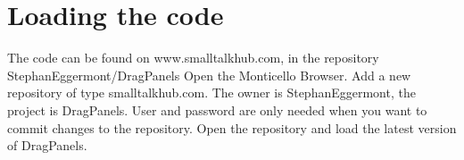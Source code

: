 \documentclass[10pt, twoside]{article}   	%
\begin{document}
\section{Loading the code}
The code can be found on www.smalltalkhub.com, in the repository StephanEggermont/DragPanels
Open the Monticello Browser. Add a new repository of type smalltalkhub.com. 
The owner is StephanEggermont, the project is DragPanels. User and password are only needed
when you want to commit changes to the repository. Open the repository and load the latest version of
DragPanels.
\end{document}
